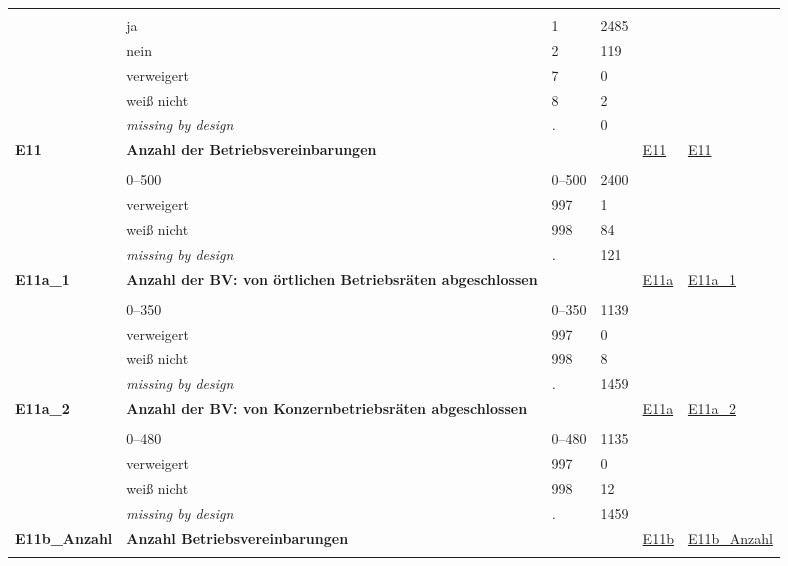 \begin{longtable}{| L{2.45cm} | L{6cm} | C{1.5cm} | R{1cm} | C{2.25cm} | C{2.25cm} |}
   &  &  &  &  &  \\ 
   & ja & 1 & 2485 &  &  \\ 
   & nein & 2 & 119 &  &  \\ 
   & verweigert & 7 & 0 &  &  \\ 
   & weiß nicht & 8 & 2 &  &  \\ 
   & \textit{missing by design} & \textit{.} & 0 &  &  \\ 
   \midrule
\textbf{E11}\label{var:E11} & \textbf{Anzahl der Betriebsvereinbarungen} &  &  & \hyperref[E11]{E11} & \hyperref[var:suf:E11]{E11} \\ 
   &  &  &  &  &  \\ 
   & 0--500 & 0--500 & 2400 &  &  \\ 
   & verweigert & 997 & 1 &  &  \\ 
   & weiß nicht & 998 & 84 &  &  \\ 
   & \textit{missing by design} & \textit{.} & 121 &  &  \\ 
   \midrule
\textbf{E11a\_1}\label{var:E11a:1} & \textbf{Anzahl der BV: von örtlichen Betriebsräten abgeschlossen} &  &  & \hyperref[E11a]{E11a} & \hyperref[var:suf:E11a:1]{E11a\_1} \\ 
   &  &  &  &  &  \\ 
   & 0--350 & 0--350 & 1139 &  &  \\ 
   & verweigert & 997 & 0 &  &  \\ 
   & weiß nicht & 998 & 8 &  &  \\ 
   & \textit{missing by design} & \textit{.} & 1459 &  &  \\ 
   \midrule
\textbf{E11a\_2}\label{var:E11a:2} & \textbf{Anzahl der BV: von Konzernbetriebsräten abgeschlossen} &  &  & \hyperref[E11a]{E11a} & \hyperref[var:suf:E11a:2]{E11a\_2} \\ 
   &  &  &  &  &  \\ 
   & 0--480 & 0--480 & 1135 &  &  \\ 
   & verweigert & 997 & 0 &  &  \\ 
   & weiß nicht & 998 & 12 &  &  \\ 
   & \textit{missing by design} & \textit{.} & 1459 &  &  \\ 
   \midrule
\textbf{E11b\_Anzahl}\label{var:E11b:Anzahl} & \textbf{Anzahl Betriebsvereinbarungen} &  &  & \hyperref[E11b]{E11b} & \hyperref[var:suf:E11b:Anzahl]{E11b\_Anzahl} \\ 
   &  &  &  &  &  \\ 

\end{longtable}
